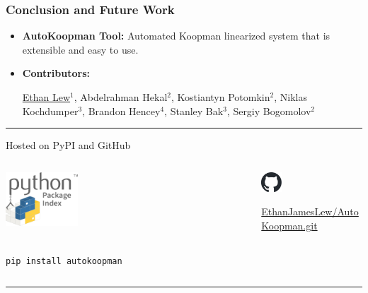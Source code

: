 \documentclass[shortpres,aspectratio=43]{beamer}
\begin{document}
\begin{frame}[fragile]
\frametitle{Conclusion and Future Work}

\begin{itemize}
\item \textbf{AutoKoopman Tool:} Automated Koopman linearized system that is extensible and easy to use.
\item \textbf{Contributors:}
\begin{scriptsize}
 \underline{Ethan Lew}$^1$, Abdelrahman Hekal$^2$, Kostiantyn Potomkin$^2$, Niklas Kochdumper$^3$, Brandon Hencey$^4$, Stanley Bak$^3$, Sergiy Bogomolov$^2$
\end{scriptsize}
\end{itemize}
\rule{\textwidth}{1pt}
\vspace{-0.25cm}
Hosted on PyPI and GitHub
\begin{columns}
    \begin{column}{0.5\linewidth}
    \begin{center}
    \includegraphics[width=0.3\textwidth]{img/PyPI_logo.pdf} 
\begin{scriptsize}
\\
    \texttt{pip install autokoopman}
\end{scriptsize}
    \end{center}
    \end{column}
    \begin{column}{0.5\linewidth}
    \begin{center}
    \includegraphics[width=0.2\textwidth]{img/github-mark.pdf}
    \\
    \begin{scriptsize}
    \url{EthanJamesLew/AutoKoopman.git}
    \end{scriptsize}
    \end{center} 
    \end{column}
\end{columns}
\rule{\textwidth}{1pt}
\vspace{-0.25cm}


\end{frame}
\end{document}
